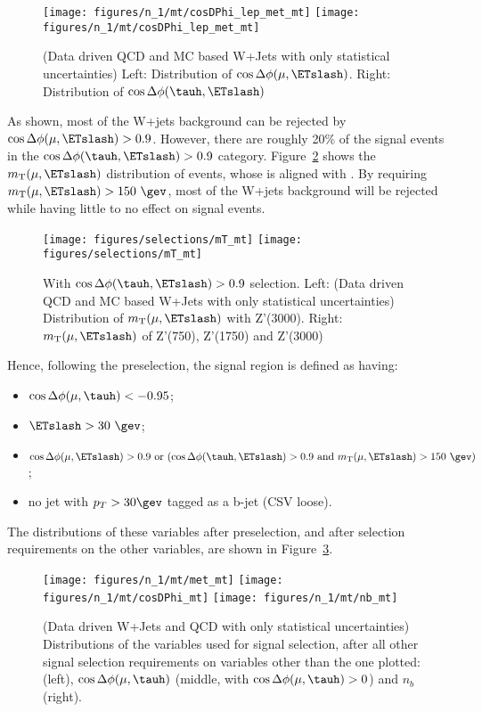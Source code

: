 \begin{figure}\centering
  \texttt{[image: figures/n\_1/mt/cosDPhi\_lep\_met\_mt]}
  \texttt{[image: figures/n\_1/mt/cosDPhi\_lep\_met\_mt]}
  \caption{\label{fig:selectionMotiviation_cosDPhi} (Data driven QCD and MC based W+Jets with only statistical uncertainties) 
Left: Distribution of $\cos{\Delta \phi (\mu,\ETslash)}$. Right: Distribution of 
$\cos{\Delta \phi (\tauh,\ETslash)}$}
\end{figure}

As shown, most of the W+jets background can be rejected by 
$\cos{\Delta \phi (\mu,\ETslash)} > 0.9$. However, there are roughly
20\% of the signal events in the $\cos{\Delta \phi (\tauh,\ETslash)} > 0.9$ 
category. Figure~\ref{fig:selectionMotiviation_mT} shows the 
$m_{\text{T}}(\mu,\ETslash)$ distribution of events, whose \ETslash is 
aligned with \tauh. By requiring $m_{\text{T}}(\mu,\ETslash) > 150~\gev$, 
most of the W+jets background will be rejected while having little 
to no effect on signal events. 

\begin{figure}\centering
  \texttt{[image: figures/selections/mT\_mt]}
  \texttt{[image: figures/selections/mT\_mt]}
  \caption{\label{fig:selectionMotiviation_mT} With $\cos{\Delta \phi (\tauh,\ETslash)} > 0.9$ 
selection. Left: (Data driven QCD and MC based W+Jets with only statistical uncertainties) 
Distribution of $m_{\text{T}}(\mu,\ETslash)$ with Z'(3000). Right: 
$m_{\text{T}}(\mu,\ETslash)$ of Z'(750), Z'(1750) and Z'(3000)}
\end{figure}
 

Hence, following the preselection, the signal region is defined as having:
\begin{itemize}
  \item $\cos{\Delta \phi (\mu,\tauh)}<-0.95$;
  \item $\ETslash>30~\gev$;
  \item $\cos{\Delta \phi (\mu,\ETslash)} > 0.9~\text{or}~(\cos{\Delta \phi (\tauh,\ETslash)} > 0.9~\text{and}~m_{\text{T}}(\mu,\ETslash) > 150~\gev)$;
  \item no jet with $p_T>30\gev$ tagged as a b-jet (CSV loose)\quad.
\end{itemize}

The distributions of these variables after preselection, and after
selection requirements on the other variables, are shown in
Figure~\ref{fig:mt_nm1_distributions}.
\begin{figure}\centering
  \texttt{[image: figures/n\_1/mt/met\_mt]}
  \texttt{[image: figures/n\_1/mt/cosDPhi\_mt]}
  \texttt{[image: figures/n\_1/mt/nb\_mt]}
  \caption{\label{fig:mt_nm1_distributions} (Data driven W+Jets and QCD with only statistical uncertainties) 
Distributions of the variables used for \tmth signal selection, after all other signal 
selection requirements on variables other than the one plotted:
    \ETslash (left), $\cos{\Delta \phi (\mu,\tauh)}$ (middle, with $\cos{\Delta \phi (\mu, \tauh)} > 0$) and $n_b$ (right).}
\end{figure}

